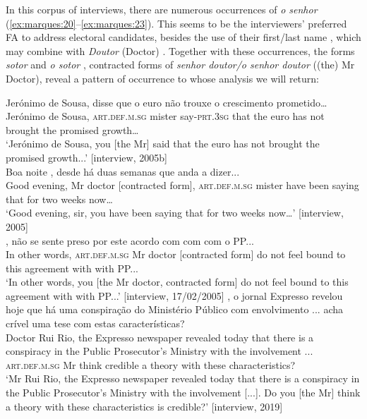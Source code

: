 \documentclass[output=paper]{langscibook}
\begin{document}
In this corpus of interviews, there are numerous occurrences of \textit{o senhor} (\ref{ex:marques:20}--\ref{ex:marques:23}). This seems to be the interviewers’ preferred FA to address electoral candidates, besides the use of their first/last name , which may combine with \textit{Doutor} (Doctor) . Together with these occurrences, the forms \textit{sotor}  and \textit{o sotor} , contracted forms of \textit{senhor doutor\slash o senhor doutor} ((the) Mr Doctor), reveal a pattern of occurrence to whose analysis we will return:

\ea\label{ex:marques:20}
\gll Jerónimo de Sousa,     disse       que o euro {não trouxe} o crescimento prometido…\\
        Jerónimo de Sousa,  \textsc{art.def.m.sg} mister  say-\textsc{prt.3sg} that the euro {has not brought} the promised growth…\\
\glt ‘Jerónimo de Sousa, you [the Mr] said that the euro has not brought the promised growth...’ [interview, 2005b]\\
\ex\label{ex:marques:21}
\gll Boa noite      ,                                {desde há duas semanas que anda a dizer...} \\
        Good evening,    {Mr doctor [contracted form]},  \textsc{art.def.m.sg} mister    {have been saying that for two weeks now…} \\
\glt ‘Good evening, sir, you have been saying that for two weeks now…’ [interview, 2005]\\
\ex\label{ex:marques:22}
,                                        {não se sente preso por este acordo com com com o PP...}\\
        {In other words},  \textsc{art.def.m.sg}  {Mr doctor [contracted form]}  {do not feel bound to this agreement with with PP...}\\
\glt ‘In other words, you [the Mr doctor, contracted form] do not feel bound to this agreement with with PP...’ [interview, 17/02/2005]
\ex\label{ex:marques:23}
\gll {}, {o jornal Expresso revelou hoje que há} {uma conspiração do Ministério Público com envolvimento ...}     acha crível uma tese com estas características?\\
         {Doctor Rui Rio}, {the Expresso newspaper revealed today that there is} {a conspiracy in the Public Prosecutor’s Ministry with the involvement ...} \textsc{art.def.m.sg}    Mr      think credible a theory with these characteristics?\\
\glt ‘Mr Rui Rio, the Expresso newspaper revealed today that there is a conspiracy in the Public Prosecutor’s Ministry with the involvement [...]. Do you [the Mr] think a theory with these characteristics is credible?’ [interview, 2019]
\z 
\end{document}
